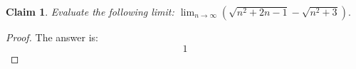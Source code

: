 \documentclass{article}
\newtheorem{theorem}{Claim}
\begin{document}
\begin{theorem}
Evaluate the following limit:
$
\lim_{n \to \infty} \left(\sqrt{n^2+2n-1}-\sqrt{n^2+3}\right).
$
\end{theorem}

\begin{proof}
The answer is:
\[
1
\]
\end{proof}
\end{document}
